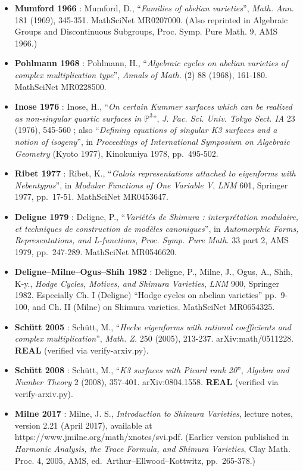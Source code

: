 \documentclass[
  11pt,
  a4paper,
]{article}
\providecommand{\tightlist}{\setlength{\itemsep}{0pt}\setlength{\parskip}{0pt}}
\providecommand{\tightlist}{%
  \setlength{\itemsep}{0pt}\setlength{\parskip}{0pt}}
\begin{document}
\begin{itemize}
\tightlist
\item
  \textbf{Mumford 1966} : Mumford, D., ``\emph{Families of abelian varieties}'', \emph{Math. Ann.} 181 (1969), 345-351. MathSciNet MR0207000. (Also reprinted in Algebraic Groups and Discontinuous Subgroups, Proc. Symp. Pure Math. 9, AMS 1966.)
\item
  \textbf{Pohlmann 1968} : Pohlmann, H., ``\emph{Algebraic cycles on abelian varieties of complex multiplication type}'', \emph{Annals of Math.} (2) 88 (1968), 161-180. MathSciNet MR0228500.
\item
  \textbf{Inose 1976} : Inose, H., ``\emph{On certain Kummer surfaces which can be realized as non-singular quartic surfaces in \(\mathbb{P}^3\)}'', \emph{J. Fac. Sci. Univ. Tokyo Sect. IA} 23 (1976), 545-560 ; also ``\emph{Defining equations of singular K3 surfaces and a notion of isogeny}'', in \emph{Proceedings of International Symposium on Algebraic Geometry} (Kyoto 1977), Kinokuniya 1978, pp.~495-502.
\item
  \textbf{Ribet 1977} : Ribet, K., ``\emph{Galois representations attached to eigenforms with Nebentypus}'', in \emph{Modular Functions of One Variable V}, \emph{LNM} 601, Springer 1977, pp.~17-51. MathSciNet MR0453647.
\item
  \textbf{Deligne 1979} : Deligne, P., ``\emph{Variétés de Shimura : interprétation modulaire, et techniques de construction de modèles canoniques}'', in \emph{Automorphic Forms, Representations, and L-functions}, \emph{Proc. Symp. Pure Math.} 33 part 2, AMS 1979, pp.~247-289. MathSciNet MR0546620.
\item
  \textbf{Deligne--Milne--Ogus--Shih 1982} : Deligne, P., Milne, J., Ogus, A., Shih, K-y., \emph{Hodge Cycles, Motives, and Shimura Varieties}, \emph{LNM} 900, Springer 1982. Especially Ch. I (Deligne) ``Hodge cycles on abelian varieties'' pp.~9-100, and Ch. II (Milne) on Shimura varieties. MathSciNet MR0654325.
\item
  \textbf{Schütt 2005} : Schütt, M., ``\emph{Hecke eigenforms with rational coefficients and complex multiplication}'', \emph{Math. Z.} 250 (2005), 213-237. arXiv:math/0511228. \textbf{REAL} (verified via verify-arxiv.py).
\item
  \textbf{Schütt 2008} : Schütt, M., ``\emph{K3 surfaces with Picard rank 20}'', \emph{Algebra and Number Theory} 2 (2008), 357-401. arXiv:0804.1558. \textbf{REAL} (verified via verify-arxiv.py).
\item
  \textbf{Milne 2017} : Milne, J. S., \emph{Introduction to Shimura Varieties}, lecture notes, version 2.21 (April 2017), available at https://www.jmilne.org/math/xnotes/svi.pdf. (Earlier version published in \emph{Harmonic Analysis, the Trace Formula, and Shimura Varieties}, Clay Math. Proc. 4, 2005, AMS, ed.~Arthur--Ellwood--Kottwitz, pp.~265-378.)
\end{itemize}
\end{document}
